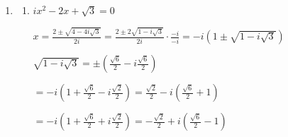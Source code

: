 \documentclass[12pt, openright, a4paper, twoside, english, brazil]{article}
\newenvironment{qmitem}{
  \color{black}
\item
\begin{enumerate}[\bfseries a)]}{
\end{enumerate}\vspace{10pt}}
\begin{document}
\begin{enumerate}[\bfseries 1.]
\begin{qmitem}
\color{black}
\item $ix^2-2x+\sqrt3=0$
\color{red}

$\displaystyle
x=\frac{2\pm\sqrt{4-4i\sqrt3}}{2i}=\frac{2\pm2\sqrt{1-i\sqrt3}}{2i}\cdot\frac{-i}{-i}=-i(1\pm\sqrt{1-i\sqrt{3}})$

$\displaystyle
\sqrt{1-i\sqrt3}=\pm\left(\frac{\sqrt6}{2}-i\frac{\sqrt6}{2}\right)$

$\displaystyle
=-i\left(1+\frac{\sqrt6}{2}-i\frac{\sqrt2}{2}\right)=\frac{\sqrt2}{2}-i\left(\frac{\sqrt6}{2}+1\right)$

$\displaystyle=-i\left(1+\frac{\sqrt6}{2}+i\frac{\sqrt2}{2}\right)=-\frac{\sqrt2}{2}+i\left(\frac{\sqrt6}{2}-1\right)$

\end{qmitem}

\end{enumerate}
\end{document}
